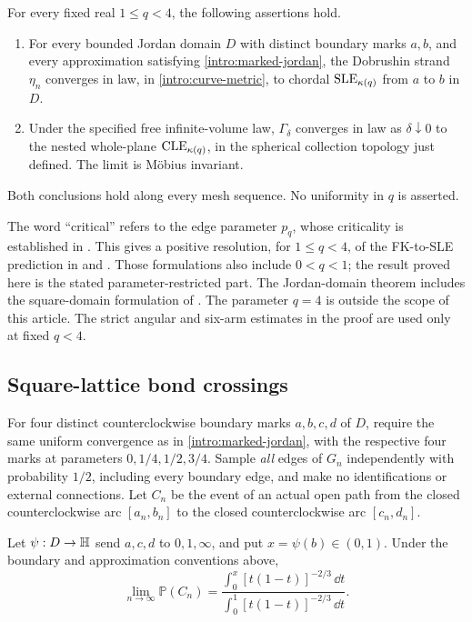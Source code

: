 \begin{theorem}
\label{intro:main}
For every fixed real $1\le q<4$, the following assertions hold.
\begin{enumerate}[label=\textup{(\roman*)}]
\item For every bounded Jordan domain $D$ with distinct boundary marks
$a,b$, and every approximation satisfying
\eqref{intro:marked-jordan}, the Dobrushin strand $\eta_n$ converges in
law, in \eqref{intro:curve-metric}, to chordal $\operatorname{SLE}_{\kappa(q)}$ from
$a$ to $b$ in $D$.
\item Under the specified free infinite-volume law,
$\Gamma_\delta$ converges in law as $\delta\downarrow0$ to the nested
whole-plane $\operatorname{CLE}_{\kappa(q)}$, in the spherical collection topology
just defined.  The limit is M\"obius invariant.
\end{enumerate}
Both conclusions hold along every mesh sequence.  No uniformity in $q$
is asserted.
\end{theorem}

The word ``critical'' refers to the edge parameter $p_q$, whose
criticality is established in \citet{BeffaraDuminilCopin2012}.
This gives a positive resolution, for $1\le q<4$, of the FK-to-SLE
prediction in \citet[Conjecture~9.7]{RohdeSchramm2005} and
\citet[Problem~2.6]{Schramm2007Problems}.  Those formulations also include
$0<q<1$; the result proved here is the stated parameter-restricted part.
The Jordan-domain theorem includes the square-domain formulation of
\citet{RohdeSchramm2005}.
The parameter $q=4$ is outside the scope of this article.  The strict
angular and six-arm estimates in the proof are used only at fixed
$q<4$.

\subsection{Square-lattice bond crossings}
\label{intro:crossings}

For four distinct counterclockwise boundary marks $a,b,c,d$ of $D$,
require the same uniform convergence as in
\eqref{intro:marked-jordan}, with the respective four marks at
parameters $0,1/4,1/2,3/4$.  Sample \emph{all} edges of $G_n$
independently with probability $1/2$, including every boundary edge, and
make no identifications or external connections.  Let $C_n$ be the
event of an actual open path from the closed counterclockwise arc
$[a_n,b_n]$ to the closed counterclockwise arc $[c_n,d_n]$.

\begin{theorem}
\label{intro:cardy}
Let $\psi:D\to\mathbb H$ send $a,c,d$ to $0,1,\infty$, and put
$x=\psi(b)\in(0,1)$.  Under the boundary and approximation conventions
above,
\begin{equation}\label{intro:cardy-formula}
 \lim_{n\to\infty}\mathbb P(C_n)
 =\frac{\displaystyle\int_0^x[t(1-t)]^{-2/3}\,\dd t}
        {\displaystyle\int_0^1[t(1-t)]^{-2/3}\,\dd t}.
\end{equation}
\end{theorem}

